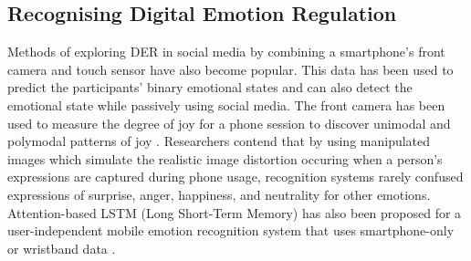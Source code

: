 \subsection{Recognising Digital Emotion Regulation}
Methods of exploring DER in social media by combining a smartphone's front camera and touch sensor have also become popular. This data has been used to predict the participants' binary emotional states and can also detect the emotional state while passively using social media. The front camera has been used to measure the degree of joy for a phone session to discover unimodal and polymodal patterns of joy \cite{tag2022emotion}. Researchers contend that by using manipulated images which simulate the realistic image distortion occuring when a person's expressions are captured during phone usage, recognition systems rarely confused expressions of surprise, anger, happiness, and neutrality for other emotions. Attention-based LSTM (Long Short-Term Memory) has also been proposed for a user-independent mobile emotion recognition system that uses smartphone-only or wristband data \cite{yang2021behavioral}.

